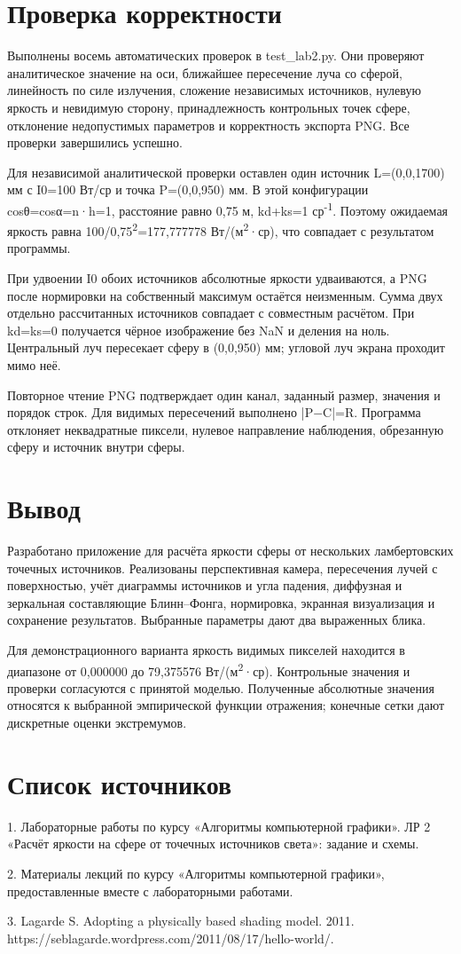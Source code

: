 \documentclass[a4paper,12pt]{article}
\begin{document}
\clearpage
\section{Проверка корректности}
Выполнены восемь автоматических проверок в test\_lab2.py. Они проверяют аналитическое значение на оси, ближайшее пересечение луча со сферой, линейность по силе излучения, сложение независимых источников, нулевую яркость и невидимую сторону, принадлежность контрольных точек сфере, отклонение недопустимых параметров и корректность экспорта PNG. Все проверки завершились успешно.

Для независимой аналитической проверки оставлен один источник L=(0,0,1700) мм с I0=100 Вт/ср и точка P=(0,0,950) мм. В этой конфигурации cosθ=cosα=n·h=1, расстояние равно 0,75 м, kd+ks=1 ср\textsuperscript{-}\textsuperscript{1}. Поэтому ожидаемая яркость равна 100/0,75\textsuperscript{2}=177,777778 Вт/(м\textsuperscript{2}·ср), что совпадает с результатом программы.

При удвоении I0 обоих источников абсолютные яркости удваиваются, а PNG после нормировки на собственный максимум остаётся неизменным. Сумма двух отдельно рассчитанных источников совпадает с совместным расчётом. При kd=ks=0 получается чёрное изображение без NaN и деления на ноль. Центральный луч пересекает сферу в (0,0,950) мм; угловой луч экрана проходит мимо неё.

Повторное чтение PNG подтверждает один канал, заданный размер, значения и порядок строк. Для видимых пересечений выполнено |P\ensuremath{-}C|=R. Программа отклоняет неквадратные пиксели, нулевое направление наблюдения, обрезанную сферу и источник внутри сферы.

\section{Вывод}
Разработано приложение для расчёта яркости сферы от нескольких ламбертовских точечных источников. Реализованы перспективная камера, пересечения лучей с поверхностью, учёт диаграммы источников и угла падения, диффузная и зеркальная составляющие Блинн–Фонга, нормировка, экранная визуализация и сохранение результатов. Выбранные параметры дают два выраженных блика.

Для демонстрационного варианта яркость видимых пикселей находится в диапазоне от 0,000000 до 79,375576 Вт/(м\textsuperscript{2}·ср). Контрольные значения и проверки согласуются с принятой моделью. Полученные абсолютные значения относятся к выбранной эмпирической функции отражения; конечные сетки дают дискретные оценки экстремумов.

\section{Список источников}
1. Лабораторные работы по курсу «Алгоритмы компьютерной графики». ЛР 2 «Расчёт яркости на сфере от точечных источников света»: задание и схемы.

2. Материалы лекций по курсу «Алгоритмы компьютерной графики», предоставленные вместе с лабораторными работами.

3. Lagarde S. Adopting a physically based shading model. 2011. https://seblagarde.wordpress.com/2011/08/17/hello-world/.
\end{document}
